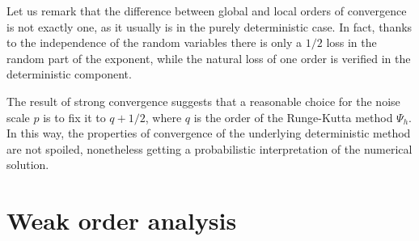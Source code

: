 \documentclass{siamart1116}
\numberwithin{theorem}{section}
\begin{document}
\begin{remark} Let us remark that the difference between global and local orders of convergence is not exactly one, as it usually is in the purely deterministic case. In fact, thanks to the independence of the random variables there is only a $1/2$ loss in the random part of the exponent, while the natural loss of one order is verified in the deterministic component.
\end{remark}
\begin{remark} The result of strong convergence suggests that a reasonable choice for the noise scale $p$ is to fix it to  $q + 1/2$, where $q$ is the order of the Runge-Kutta method $\Psi_h$. In this way, the properties of convergence of the underlying deterministic method are not spoiled, nonetheless getting a probabilistic interpretation of the numerical solution.
\end{remark}

\section{Weak order analysis}\label{sec:WeakOrder}
\end{document}

